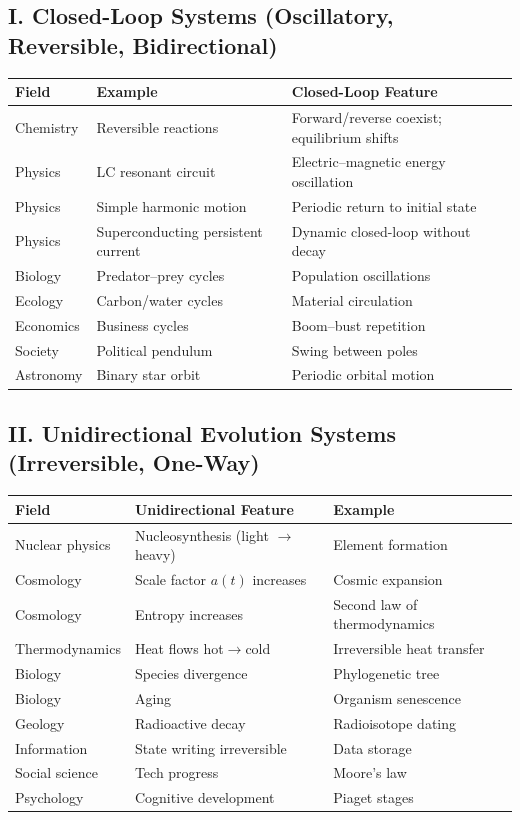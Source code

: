 \documentclass[10pt,a4paper]{article}
\begin{document}
\subsection{I. Closed-Loop Systems (Oscillatory, Reversible, Bidirectional)}
\begin{center}
\small
\begin{tabular}{p{1.5cm}p{3.2cm}p{3.5cm}}
\toprule
Field & Example & Closed-Loop Feature \\
\midrule
Chemistry & Reversible reactions & Forward/reverse coexist; equilibrium shifts \\
Physics & LC resonant circuit & Electric–magnetic energy oscillation \\
Physics & Simple harmonic motion & Periodic return to initial state \\
Physics & Superconducting persistent current & Dynamic closed-loop without decay \\
Biology & Predator–prey cycles & Population oscillations \\
Ecology & Carbon/water cycles & Material circulation \\
Economics & Business cycles & Boom–bust repetition \\
Society & Political pendulum & Swing between poles \\
Astronomy & Binary star orbit & Periodic orbital motion \\
\bottomrule
\end{tabular}
\end{center}

\subsection{II. Unidirectional Evolution Systems (Irreversible, One-Way)}
\begin{center}
\small
\begin{tabular}{p{1.8cm}p{2.8cm}p{2.8cm}}
\toprule
Field & Unidirectional Feature & Example \\
\midrule
Nuclear physics & Nucleosynthesis (light $\to$ heavy) & Element formation \\
Cosmology & Scale factor $a(t)$ increases & Cosmic expansion \\
Cosmology & Entropy increases & Second law of thermodynamics \\
Thermodynamics & Heat flows hot$\to$cold & Irreversible heat transfer \\
Biology & Species divergence & Phylogenetic tree \\
Biology & Aging & Organism senescence \\
Geology & Radioactive decay & Radioisotope dating \\
Information & State writing irreversible & Data storage \\
Social science & Tech progress & Moore’s law \\
Psychology & Cognitive development & Piaget stages \\
\bottomrule
\end{tabular}
\end{center}
\end{document}
